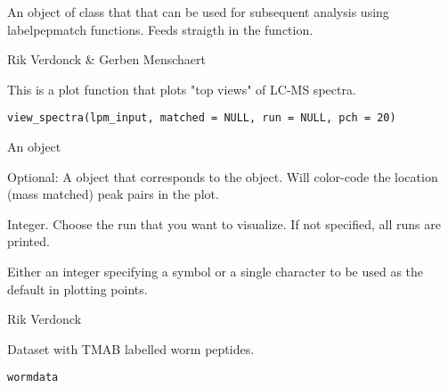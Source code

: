 \documentclass[letterpaper]{book}
\begin{document}
%
\begin{Value}
An object of class  that that can be used for subsequent analysis using labelpepmatch functions. Feeds straigth in the  function.
\end{Value}
%
\begin{Author}\relax
Rik Verdonck \& Gerben Menschaert
\end{Author}
%
\begin{Description}\relax
This is a plot function that plots "top views" of LC-MS spectra.
\end{Description}
%
\begin{Usage}
\begin{verbatim}
view_spectra(lpm_input, matched = NULL, run = NULL, pch = 20)
\end{verbatim}
\end{Usage}
%
\begin{Arguments}
\begin{ldescription}
\item[\code{lpm\_input}] An  object

\item[\code{matched}] Optional: A  object that corresponds to the  object. Will color-code the location (mass matched) peak pairs in the plot.

\item[\code{run}] Integer. Choose the run that you want to visualize. If not specified, all runs are printed.

\item[\code{pch}] Either an integer specifying a symbol or a single character to be used as the default in plotting points.
\end{ldescription}
\end{Arguments}
%
\begin{Author}\relax
Rik Verdonck
\end{Author}
%
\begin{Description}\relax
Dataset with TMAB labelled worm peptides.
\end{Description}
%
\begin{Usage}
\begin{verbatim}
wormdata
\end{verbatim}
\end{Usage}
\end{document}
